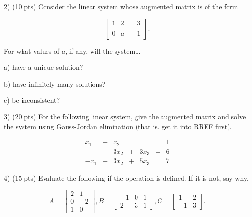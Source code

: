 \documentclass{article}
\begin{document}
\begin{flushleft}
\vspace{1in}

2) (10 pts) Consider the linear system whose augmented matrix is of the form

\begin{equation*}
\begin{bmatrix}
1 & 2 & | & 3\\
0 & a & | & 1
\end{bmatrix}.
\end{equation*}

For what values of $a$, if any, will the system...

\vspace{.2in}

a) have a unique solution?

\vspace{0.75in}

b) have infinitely many solutions?

\vspace{0.75in}

c) be inconsistent?

\pagebreak

3) (20 pts) For the following linear system, give the augmented matrix and solve the system using Gauss-Jordan elimination (that is, get it into RREF first).

\begin{equation*}
\begin{array}{ccccccc}
x_{1} & + & x_{2} &  &  & = & 1\\
 &  & 3x_{2} & + & 3x_{3} & = & 6\\
-x_{1} & + & 3x_{2} & + & 5x_{3} & = & 7
\end{array}
\end{equation*}

\pagebreak

4) (15 pts) Evaluate the following if the operation is defined.  If it is not, say why.

\begin{equation*}
A = 
\begin{bmatrix}
2 & 1 \\
0 & -2 \\
1 & 0 
\end{bmatrix}, B = 
\begin{bmatrix}
-1 & 0 & 1\\
2 & 3 & 1
\end{bmatrix}, C =
\begin{bmatrix}
1 & 2 \\
-1 & 3
\end{bmatrix}.
\end{equation*}


\end{flushleft}
\end{document}
